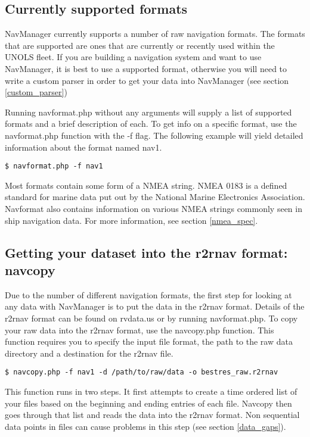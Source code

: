 \documentclass{article}
\begin{document}
		\subsection{Currently supported formats}
			
NavManager currently supports a number of raw navigation formats.  The formats that are supported are ones that are currently or recently used within the UNOLS fleet.  If you are building a navigation system and want to use NavManager, it is best to use a supported format, otherwise you will need to write a custom parser in order to get your data into NavManager (see section \ref{custom_parser})

Running navformat.php without any arguments will supply a list of supported formats and a brief description of each.  To get info on a specific format, use the navformat.php function with the -f flag.  The following example will yield detailed information about the format named nav1.

		\begin{lstlisting}
$ navformat.php -f nav1
		\end{lstlisting}
			
Most formats contain some form of a NMEA string.  NMEA 0183 is a defined standard for marine data put out by the National Marine Electronics Association.  Navformat also contains information on various NMEA strings commonly seen in ship navigation data.  For more information, see section \ref{nmea_spec}.

		\subsection{Getting your dataset into the r2rnav format: navcopy}
		
Due to the number of different navigation formats, the first step for looking at any data with NavManager is to put the data in the r2rnav format.  Details of the r2rnav format can be found on rvdata.us or by running navformat.php.  To copy your raw data into the r2rnav format, use the navcopy.php function.  This function requires you to specify the input file format, the path to the raw data directory and a destination for the r2rnav file.

		\begin{lstlisting}
$ navcopy.php -f nav1 -d /path/to/raw/data -o bestres_raw.r2rnav
		\end{lstlisting}
		
This function runs in two steps.  It first attempts to create a time ordered list of your files based on the beginning and ending entries of each file.  Navcopy then goes through that list and reads the data into the r2rnav format.  Non sequential data points in files can cause problems in this step (see section \ref{data_gaps}).
		
\end{document}
